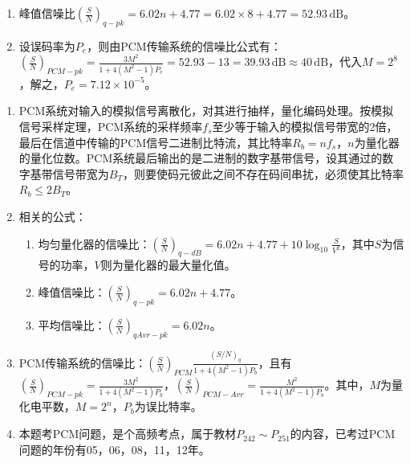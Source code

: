 {\begin{enumerate}
  设传输该PCM信号所需最小带宽为$B_T$，则由$R_b=2B_T$得$B_T=\frac{1}{2}R_b=32\,\mathrm{kHz}$。
  \item 峰值信噪比$\left(\frac{S}{N}\right)_{q-pk}=6.02n+4.77=6.02\times8+4.77=52.93\,\mathrm{dB}$。
  \item 设误码率为$P_e$，则由PCM传输系统的信噪比公式有：$\left(\frac{S}{N}\right)_{PCM-pk}=\frac{3M^2}{1+4(M^2-1)P_e}=52.93-13=39.93\,\mathrm{dB}\approx 40\,\mathrm{dB}$，代入$M=2^8$，解之，$P_e=7.12\times10^{-5}$。
\end{enumerate}
\begin{parchment}[综述]
  \begin{enumerate}
    \item PCM系统对输入的模拟信号离散化，对其进行抽样，量化编码处理。按模拟信号采样定理，PCM系统的采样频率$f_s$至少等于输入的模拟信号带宽的2倍，最后在信道中传输的PCM信号二进制比特流，其比特率$R_b=nf_s$，$n$为量化器的量化位数。PCM系统最后输出的是二进制的数字基带信号，设其通过的数字基带信号带宽为$B_T$，则要使码元彼此之间不存在码间串扰，必须使其比特率$R_b\leqslant 2B_T$。
    \item 相关的公式：
    \begin{enumerate}
      \item 均匀量化器的信噪比：$\left(\frac{S}{N}\right)_{q-dB}=6.02n+4.77+10\log_{10}\frac{S}{V^2}$，其中$S$为信号的功率，$V$则为量化器的最大量化值。
      \item 峰值信噪比：$\left(\frac{S}{N}\right)_{q-pk}=6.02n+4.77$。
      \item 平均信噪比：$\left(\frac{S}{N}\right)_{qAvr-pk}=6.02n$。
    \end{enumerate}
    \item PCM传输系统的信噪比：$\left(\frac{S}{N}\right)_{PCM}\frac{(S/N)_q}{1+4(M^2-1)P_b}$，且有$\left(\frac{S}{N}\right)_{PCM-pk}=\frac{3M^2}{1+4(M^2-1)P_b}$，$\left(\frac{S}{N}\right)_{PCM-Avr}=\frac{M^2}{1+4(M^2-1)P_b}$。其中，$M$为量化电平数，$M=2^n$，$P_b$为误比特率。
    \item 本题考PCM问题，是个高频考点，属于教材$P_{242}\sim P_{251}$的内容，已考过PCM问题的年份有05，06，08，11，12年。
  \end{enumerate}
\end{parchment}
}

